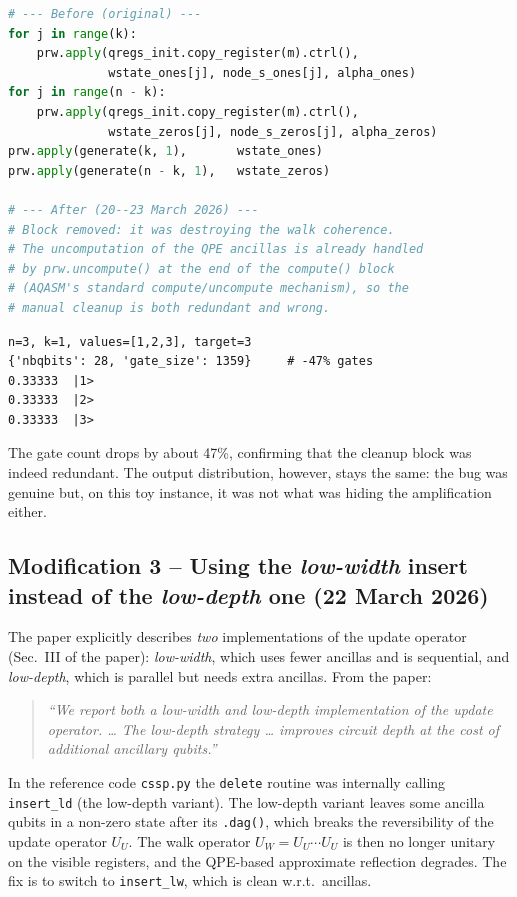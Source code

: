 \documentclass[11pt,a4paper]{article}
\begin{document}
\begin{lstlisting}[language=Python]
# --- Before (original) ---
for j in range(k):
    prw.apply(qregs_init.copy_register(m).ctrl(),
              wstate_ones[j], node_s_ones[j], alpha_ones)
for j in range(n - k):
    prw.apply(qregs_init.copy_register(m).ctrl(),
              wstate_zeros[j], node_s_zeros[j], alpha_zeros)
prw.apply(generate(k, 1),       wstate_ones)
prw.apply(generate(n - k, 1),   wstate_zeros)

# --- After (20--23 March 2026) ---
# Block removed: it was destroying the walk coherence.
# The uncomputation of the QPE ancillas is already handled
# by prw.uncompute() at the end of the compute() block
# (AQASM's standard compute/uncompute mechanism), so the
# manual cleanup is both redundant and wrong.
\end{lstlisting}

\begin{lstlisting}[style=plain]
n=3, k=1, values=[1,2,3], target=3
{'nbqbits': 28, 'gate_size': 1359}     # -47% gates
0.33333  |1>
0.33333  |2>
0.33333  |3>
\end{lstlisting}

The gate count drops by about 47\%, confirming that the cleanup block
was indeed redundant. The output distribution, however, stays the
same: the bug was genuine but, on this toy instance, it was not what
was hiding the amplification either.

\subsection*{Modification 3 -- Using the
\emph{low-width} insert instead of the \emph{low-depth} one
(22 March 2026)}

The paper explicitly describes \emph{two} implementations of the
update operator (Sec.~III of the paper): \emph{low-width}, which uses
fewer ancillas and is sequential, and \emph{low-depth}, which is
parallel but needs extra ancillas. From the paper:
\begin{quote}
\itshape
``We report both a low-width and low-depth implementation of the
update operator. \ldots{} The low-depth strategy \ldots{} improves
circuit depth at the cost of additional ancillary qubits.''
\end{quote}
In the reference code \texttt{cssp.py} the \texttt{delete} routine was
internally calling \texttt{insert\_ld} (the low-depth variant). The
low-depth variant leaves some ancilla qubits in a non-zero state after
its \texttt{.dag()}, which breaks the reversibility of the update
operator $U_U$. The walk operator $U_W = U_U\cdots U_U$ is then no
longer unitary on the visible registers, and the QPE-based
approximate reflection degrades. The fix is to switch to
\texttt{insert\_lw}, which is clean w.r.t.\ ancillas.
\end{document}
